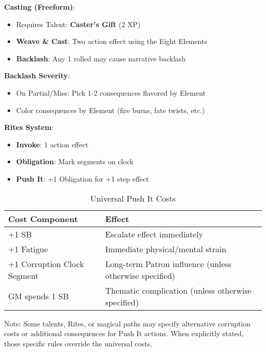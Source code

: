 \begin{tcolorbox}[colback=purple!5!white,colframe=purple!75!black,title=Magic Quick Reference,fonttitle=\bfseries]
\textbf{Casting (Freeform)}:
\begin{itemize}
\item Requires Talent: \textbf{Caster's Gift} (2 XP)
\item \textbf{Weave \& Cast}: Two action effect using the Eight Elements
\item \textbf{Backlash}: Any 1 rolled may cause narrative backlash
\end{itemize}

\textbf{Backlash Severity}:
\begin{itemize}
\item On Partial/Miss: Pick 1-2 consequences flavored by Element
\item Color consequences by Element (fire burns, fate twists, etc.)
\end{itemize}

\textbf{Rites System}:
\begin{itemize}
\item \textbf{Invoke}: 1 action effect
\item \textbf{Obligation}: Mark segments on clock
\item \textbf{Push It}: +1 Obligation for +1 step effect
\end{itemize}

\begin{table}[h]
\centering
\caption{Universal Push It Costs}
\begin{tabular}{|l|l|}
\hline
\textbf{Cost Component} & \textbf{Effect} \\ 
\hline
+1 SB & Escalate effect immediately \\ 
+1 Fatigue & Immediate physical/mental strain \\ 
+1 Corruption Clock Segment & Long-term Patron influence (unless otherwise specified) \\ 
GM spends 1 SB & Thematic complication (unless otherwise specified) \\ 
\hline
\end{tabular}
\end{table}

Note: Some talents, Rites, or magical paths may specify alternative corruption costs or additional consequences for Push It actions. When explicitly stated, those specific rules override the universal costs.


\end{tcolorbox}
